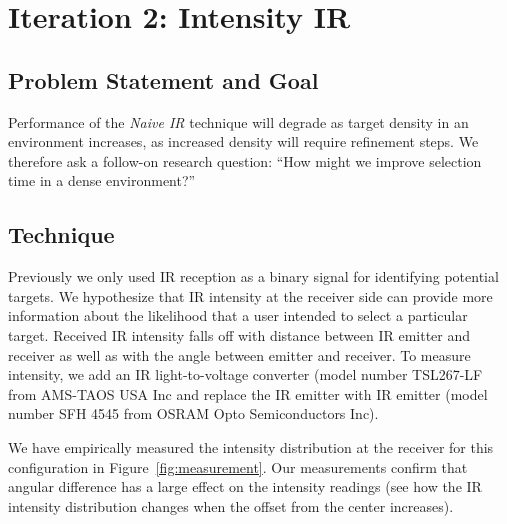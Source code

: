 
\section{Iteration 2: Intensity IR}

\subsection{Problem Statement and Goal}
Performance of the {\em Naive IR} technique will degrade as target density in an environment increases, as increased density will require refinement steps. We therefore ask a follow-on research question: ``How might we improve selection time in a dense environment?''

\subsection{Technique}
Previously we only used IR reception as a binary signal for identifying potential targets. We hypothesize that IR intensity at the receiver side can provide more information about the likelihood that a user intended to select a particular target. Received IR intensity falls off with distance between IR emitter and receiver as well as with the angle between emitter and receiver. To measure intensity, we add an IR light-to-voltage converter (model number TSL267-LF from AMS-TAOS USA Inc and replace the IR emitter with IR emitter (model number SFH 4545 from OSRAM Opto Semiconductors Inc).

We have empirically measured the intensity distribution at the receiver for this configuration in Figure~\ref{fig:measurement}. Our measurements confirm that angular difference has a large effect on the intensity readings (see how the IR intensity distribution changes when the offset from the center increases).

